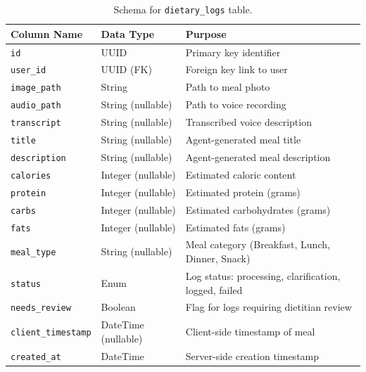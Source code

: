 \begin{table}[H]
    \centering
    \begin{tabular}{llp{6.5cm}}
        \toprule
        \textbf{Column Name}       & \textbf{Data Type}  & \textbf{Purpose}                                      \\
        \midrule
        \texttt{id}                & UUID                & Primary key identifier                                \\
        \texttt{user\_id}          & UUID (FK)           & Foreign key link to user                              \\
        \texttt{image\_path}       & String              & Path to meal photo                                    \\
        \texttt{audio\_path}       & String (nullable)   & Path to voice recording                               \\
        \texttt{transcript}        & String (nullable)   & Transcribed voice description                         \\
        \texttt{title}             & String (nullable)   & Agent-generated meal title                            \\
        \texttt{description}       & String (nullable)   & Agent-generated meal description                      \\
        \texttt{calories}          & Integer (nullable)  & Estimated caloric content                             \\
        \texttt{protein}           & Integer (nullable)  & Estimated protein (grams)                             \\
        \texttt{carbs}             & Integer (nullable)  & Estimated carbohydrates (grams)                       \\
        \texttt{fats}              & Integer (nullable)  & Estimated fats (grams)                                \\
        \texttt{meal\_type}        & String (nullable)   & Meal category (Breakfast, Lunch, Dinner, Snack)       \\
        \texttt{status}            & Enum                & Log status: processing, clarification, logged, failed \\
        \texttt{needs\_review}     & Boolean             & Flag for logs requiring dietitian review              \\
        \texttt{client\_timestamp} & DateTime (nullable) & Client-side timestamp of meal                         \\
        \texttt{created\_at}       & DateTime            & Server-side creation timestamp                        \\
        \bottomrule
    \end{tabular}
    \caption{Schema for \texttt{dietary\_logs} table.}
    \label{tab:dietary_logs_schema}
\end{table}

